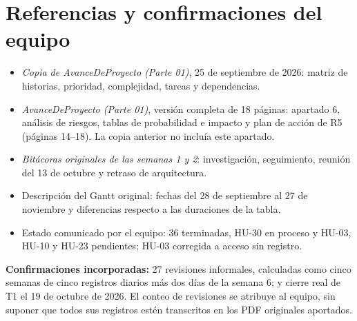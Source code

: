 \documentclass[11pt,letterpaper]{article}
\begin{document}
\section*{Referencias y confirmaciones del equipo}
\begin{itemize}
\item \textit{Copia de AvanceDeProyecto (Parte 01)}, 25 de septiembre de
2026: matriz de historias, prioridad, complejidad, tareas y dependencias.
\item \textit{AvanceDeProyecto (Parte 01)}, versión completa de 18 páginas:
apartado 6, análisis de riesgos, tablas de probabilidad e impacto y plan de
acción de R5 (páginas 14--18). La copia anterior no incluía este apartado.
\item \textit{Bitácoras originales de las semanas 1 y 2}: investigación,
seguimiento, reunión del 13 de octubre y retraso de arquitectura.
\item Descripción del Gantt original: fechas del 28 de septiembre al
27 de noviembre y diferencias respecto a las duraciones de la tabla.
\item Estado comunicado por el equipo: 36 terminadas, HU-30 en proceso y
HU-03, HU-10 y HU-23 pendientes; HU-03 corregida a acceso sin registro.
\end{itemize}
\textbf{Confirmaciones incorporadas:} 27 revisiones informales, calculadas
como cinco semanas de cinco registros diarios más dos días de la semana 6;
y cierre real de T1 el 19 de octubre de 2026. El conteo de revisiones se
atribuye al equipo, sin suponer que todos sus registros estén transcritos
en los PDF originales aportados.
\end{document}
